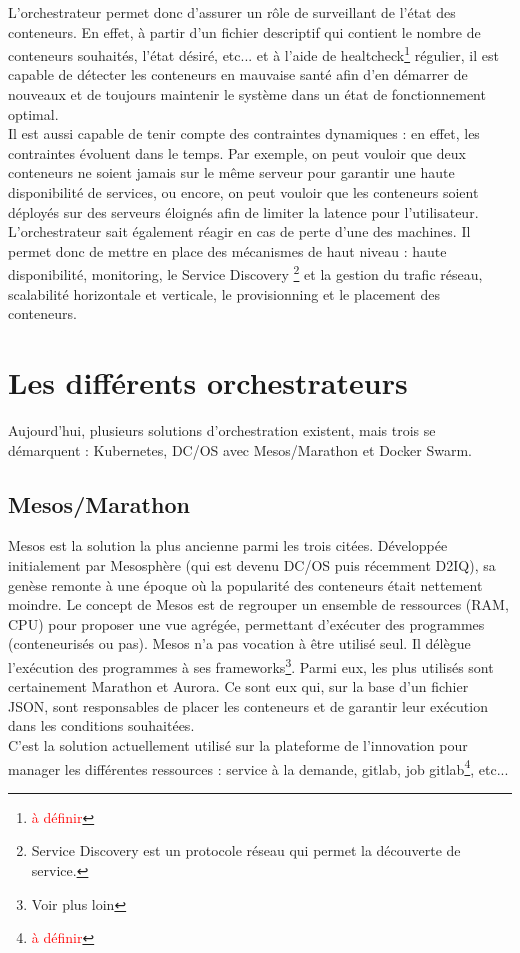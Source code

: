 \documentclass[11pt,fleqn]{book} %
\begin{document}
L'orchestrateur permet donc d'assurer un rôle de surveillant de l'état des conteneurs. En effet, à partir d'un fichier descriptif qui contient le nombre de conteneurs souhaités, l'état désiré, etc... et à l'aide de healtcheck\footnote{\textcolor{red}{à définir}} régulier, il est capable de détecter les conteneurs en mauvaise santé afin d'en démarrer de nouveaux et de toujours maintenir le système dans un état de fonctionnement optimal.\\
Il est aussi capable de tenir compte des contraintes dynamiques : en effet, les contraintes évoluent dans le temps. Par exemple, on peut vouloir que deux conteneurs ne soient jamais sur le même serveur pour garantir une haute disponibilité de services, ou encore, on peut vouloir que les conteneurs soient déployés sur des serveurs éloignés afin de limiter la latence pour l'utilisateur. L'orchestrateur sait également réagir en cas de perte d'une des machines. Il permet donc de mettre en place des mécanismes de haut niveau : haute disponibilité, monitoring, le Service Discovery \footnote{Service Discovery est un protocole réseau qui permet la découverte de service.} et la gestion du trafic réseau,  scalabilité horizontale et verticale, le provisionning et le placement des conteneurs.\\



\section{Les différents orchestrateurs}
Aujourd'hui, plusieurs solutions d'orchestration existent, mais trois se démarquent : Kubernetes, DC/OS avec Mesos/Marathon et  Docker Swarm.

\subsection{Mesos/Marathon}
Mesos est la solution la plus ancienne parmi les trois citées. Développée initialement par Mesosphère (qui est devenu DC/OS puis récemment D2IQ), sa genèse remonte à une époque où la popularité des conteneurs était nettement moindre. Le concept de Mesos est de regrouper un ensemble de ressources (RAM, CPU) pour proposer une vue agrégée, permettant d’exécuter des programmes (conteneurisés ou pas). Mesos n’a pas vocation à être utilisé seul. Il délègue l’exécution des programmes à ses frameworks\footnote{Voir plus loin}. Parmi eux, les plus utilisés sont certainement Marathon et Aurora. Ce sont eux qui, sur la base d’un fichier JSON, sont responsables de placer les conteneurs et de garantir leur exécution dans les conditions souhaitées.\\
C'est la solution actuellement utilisé sur la plateforme de l'innovation pour manager les différentes ressources : service à la demande, gitlab, job gitlab\footnote{\textcolor{red}{à définir}}, etc... \\ 
\end{document}
